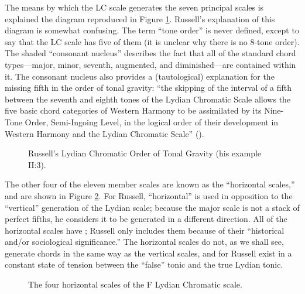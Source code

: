 The means by which the LC scale generates the seven principal scales is
explained the diagram reproduced in Figure
\ref{lcc:lc-tonal-gravity}. Russell's explanation of this diagram
is somewhat confusing. The term ``tone order'' is never defined, except to say
that the LC scale has five of them (it is unclear why there is no 8-tone
order). The shaded ``consonant nucleus'' describes the fact that all of the
standard chord types---major, minor, seventh, augmented, and diminished---are
contained within it. The consonant nucleus also provides a
(tautological) explanation for the missing fifth in the order of tonal
gravity: ``the skipping of the interval of a fifth between the seventh and
eighth tones of the Lydian Chromatic Scale allows the five basic chord
categories of Western Harmony to be assimilated by its Nine-Tone Order,
Semi-Ingoing Level, in the logical order of their development in Western
Harmony and the Lydian Chromatic Scale'' ().

\begin{figure}[tbp]
  \caption{Russell's Lydian Chromatic Order of Tonal Gravity (his example
    II:3).}
  \label{lcc:lc-tonal-gravity}
\end{figure}

The other four of the eleven member scales are known as the ``horizontal
scales,'' and are shown in Figure \ref{lcc:horizontal-scales}. For Russell,
``horizontal'' is used in opposition to the ``vertical'' generation of the
Lydian scale; because the major scale is not a stack of perfect fifths, he
considers it to be generated in a different direction. All of the horizontal
scales have \nat{}; Russell only includes them because of their ``historical
and/or sociological significance.'' The horizontal scales do not, as we shall
see, generate chords in the same way as the vertical scales, and for Russell
exist in a constant state of tension between the ``false'' tonic and the true
Lydian tonic.

\begin{figure}[tbp]
  \caption{The four horizontal scales of the F Lydian Chromatic scale.}
  \label{lcc:horizontal-scales}
\end{figure}

